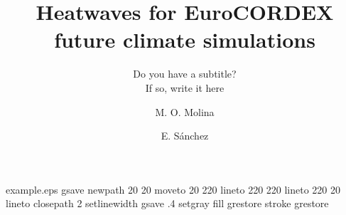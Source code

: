 %
%
%
%
%
\begin{filecontents*}{example.eps}
gsave
newpath
  20 20 moveto
  20 220 lineto
  220 220 lineto
  220 20 lineto
closepath
2 setlinewidth
gsave
  .4 setgray fill
grestore
stroke
grestore
\end{filecontents*}
%
\RequirePackage{fix-cm}
%
\documentclass[smallextended]{svjour3}       %
%
\smartqed  %
%
\usepackage{graphicx}
\usepackage{natbib}
%
%
%
%
%


\title{Heatwaves for EuroCORDEX future climate simulations
}
\subtitle{Do you have a subtitle?\\ If so, write it here}


\author{M. O. Molina         \and
        E. Sánchez %
}


 
